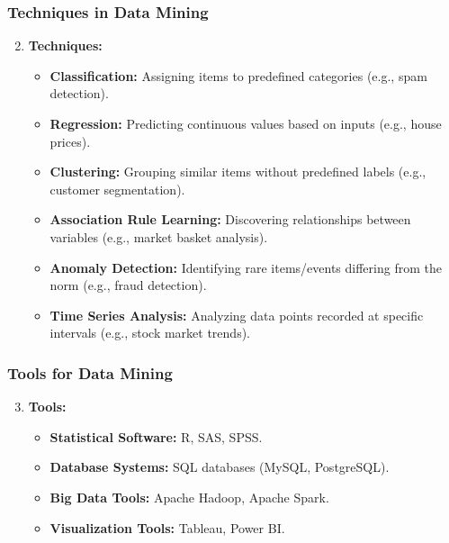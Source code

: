 \documentclass[aspectratio=169]{beamer}
\begin{document}
\begin{frame}[fragile]
    \frametitle{Techniques in Data Mining}
    \begin{enumerate}
        \setcounter{enumi}{1} %
        \item \textbf{Techniques:}
            \begin{itemize}
                \item \textbf{Classification:} Assigning items to predefined categories (e.g., spam detection).
                \item \textbf{Regression:} Predicting continuous values based on inputs (e.g., house prices).
                \item \textbf{Clustering:} Grouping similar items without predefined labels (e.g., customer segmentation).
                \item \textbf{Association Rule Learning:} Discovering relationships between variables (e.g., market basket analysis).
                \item \textbf{Anomaly Detection:} Identifying rare items/events differing from the norm (e.g., fraud detection).
                \item \textbf{Time Series Analysis:} Analyzing data points recorded at specific intervals (e.g., stock market trends).
            \end{itemize}
    \end{enumerate}
\end{frame}

\begin{frame}[fragile]
    \frametitle{Tools for Data Mining}
    \begin{enumerate}
        \setcounter{enumi}{2} %
        \item \textbf{Tools:}
            \begin{itemize}
                \item \textbf{Statistical Software:} R, SAS, SPSS.
                \item \textbf{Database Systems:} SQL databases (MySQL, PostgreSQL).
                \item \textbf{Big Data Tools:} Apache Hadoop, Apache Spark.
                \item \textbf{Visualization Tools:} Tableau, Power BI.
            \end{itemize}
    \end{enumerate}
\end{frame}
\end{document}
